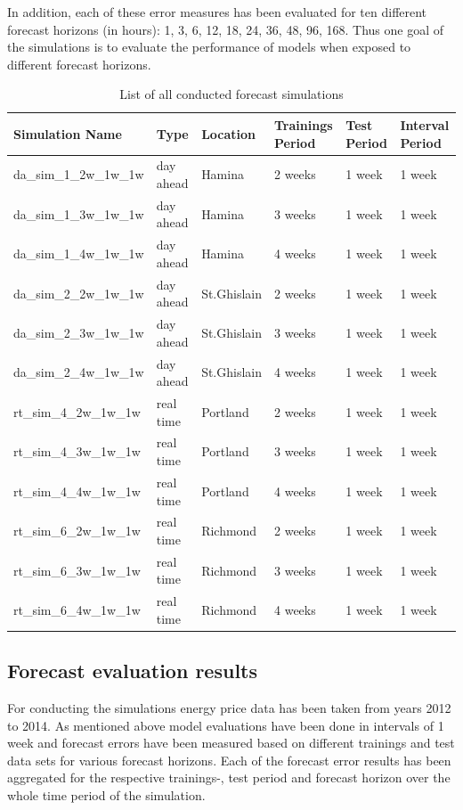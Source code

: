 In addition, each of these error measures has been evaluated for ten different forecast horizons (in hours): 
1, 3, 6, 12, 18, 24, 36, 48, 96, 168. Thus one goal of the simulations is to evaluate the performance of models when exposed to 
different forecast horizons. 

\begin{table}[ht]
\centering
\begin{tabular}{llllll}
  \hline
 Simulation Name &  Type & Location & Trainings Period & Test Period & Interval Period \\
  \hline
	da\_sim\_1\_2w\_1w\_1w & day ahead & Hamina & 2 weeks & 1 week & 1 week \\
	da\_sim\_1\_3w\_1w\_1w & day ahead & Hamina & 3 weeks & 1 week & 1 week \\
	da\_sim\_1\_4w\_1w\_1w & day ahead & Hamina & 4 weeks & 1 week & 1 week \\
	\hline
	da\_sim\_2\_2w\_1w\_1w & day ahead & St.Ghislain & 2 weeks & 1 week & 1 week \\
	da\_sim\_2\_3w\_1w\_1w & day ahead & St.Ghislain & 3 weeks & 1 week & 1 week \\
	da\_sim\_2\_4w\_1w\_1w & day ahead & St.Ghislain & 4 weeks & 1 week & 1 week \\
	\hline
	rt\_sim\_4\_2w\_1w\_1w & real time & Portland & 2 weeks & 1 week & 1 week \\
	rt\_sim\_4\_3w\_1w\_1w & real time & Portland & 3 weeks & 1 week & 1 week \\
	rt\_sim\_4\_4w\_1w\_1w & real time & Portland & 4 weeks & 1 week & 1 week \\
	\hline
	rt\_sim\_6\_2w\_1w\_1w & real time & Richmond & 2 weeks & 1 week & 1 week \\
	rt\_sim\_6\_3w\_1w\_1w & real time & Richmond & 3 weeks & 1 week & 1 week \\
	rt\_sim\_6\_4w\_1w\_1w & real time & Richmond & 4 weeks & 1 week & 1 week \\
   \hline
\end{tabular}
\caption{List of all conducted forecast simulations}
\label{tab:list_of_conducted_forecast_simulations}
\end{table}




\subsection{Forecast evaluation results}

For conducting the simulations energy price data has been taken from years 2012 to 2014. As mentioned above model evaluations have been done in intervals of 1 week and forecast errors have been measured based on different trainings and test data sets for various forecast horizons. Each of the forecast error results has been aggregated for the respective trainings-, test period and forecast horizon over the whole time period of the simulation. 


